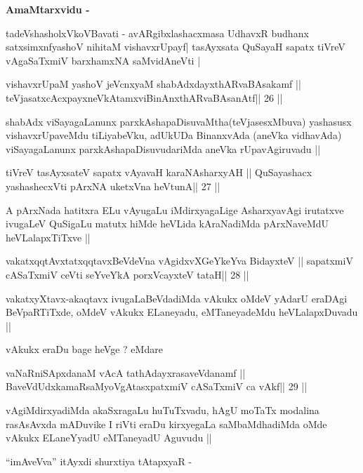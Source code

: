 {\centerline{\textbf{AmaMtarxvidu -}}}

\begin{artha}
tadeVshasholxVkoVBavati - avARgibxlashacxmasa UdhavxR budhanx
satxsimxnfyashoV  nihitaM vishavxrUpayf| tasAyx\s\s sata QuSayaH
sapatx tiVreV vAgaSaTxmiV barxhamxNA saMvidAneVti |
\end{artha}

\begin{shl}
vishavxrUpaM yashoV jeVcnxyaM shabAdxdayxthARvaBAsakamf ||
teVjasatxcAcxpayxneVkAtamxviBinAnxthARvaBAsanAtf\hfill || 26 ||
\end{shl}

\begin{artha}
shabAdx viSayagaLanunx parxkAshapaDisuvaMtha(teVjasesxMbuva) yashasusx
vishavxrUpaveMdu tiLiyabeVku, adUkUDa BinanxvAda (aneVka vidhavAda)
viSayagaLanunx parxkAshapaDisuvudariMda aneVka rUpavAgiruvadu ||
\end{artha}

\begin{shl}
tiVreV tasAyx\s\s sateV sapatx vAyavaH karaNAsharxyAH ||
QuSayashacx yashashecxVti pArxNA uketxVna heVtunA\hfill || 27 ||
\end{shl}

\begin{artha}
A pArxNada hatitxra ELu vAyugaLu iMdirxyagaLige AsharxyavAgi irutatxve
ivugaLeV QuSigaLu matutx hiMde heVLida kAraNadiMda pArxNaveMdU
heVLalapxTiTxve ||
\end{artha}

\begin{shl}
vakatxqqtAvxtatxqqtavxBeVdeVna vAgidxvXGeYkeYva BidayxteV ||
sapatxmiV cASaTxmiV ceVti seYveYkA porxVcayxteV tataH\hfill || 28 ||
\end{shl}

\begin{artha}
vakatxyXtavx-akaqtavx ivugaLaBeVdadiMda vAkukx oMdeV yAdarU eraDAgi
BeVpaRTiTxde, oMdeV vAkukx ELaneyadu, eMTaneyadeMdu heVLalapxDuvadu ||

vAkukx eraDu bage heVge ? eMdare
\end{artha}

\begin{shl}
vaNaRniSApxdanaM vAcA tathA\s\s dayxrasaveVdanamf ||
BaveVdUdxkamaRsaMyoVgAtasxpatxmiV cASaTxmiV ca vAkf\hfill || 29 ||
\end{shl}

\begin{artha}
vAgiMdirxyadiMda akaSxragaLu huTuTxvadu, hAgU moTaTx modalina
rasAsAvxda mADuvike I riVti eraDu kirxyegaLa saMbaMdhadiMda oMde
vAkukx ELaneYyadU eMTaneyadU Aguvudu ||

``imAveVva'' itAyxdi shurxtiya tAtapxyaR -
\end{artha}

